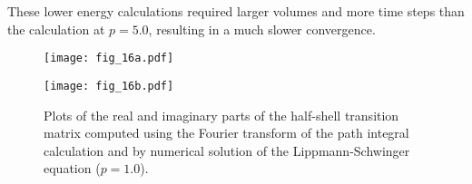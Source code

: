 \documentclass[aps,prc,reprint,noshowpacs,groupedaddress,onecolumn]{revtex4}
\begin{document}
These lower energy calculations required larger volumes and more time steps than
the calculation at $p=5.0$, resulting in a much slower convergence.
\begin{figure}
\caption{Plots of the real and imaginary parts of the
half-shell transition
matrix computed using the Fourier transform of the path integral
calculation and by numerical solution of the Lippmann-Schwinger
equation ($p=1.0$).}
\begin{minipage}[t]{.45\linewidth} 
\centering
\texttt{[image: fig\_16a.pdf]}
\end{minipage}
\begin{minipage}[t]{.45\linewidth}
\centering
\texttt{[image: fig\_16b.pdf]}
\end{minipage}
\label{figure 16}
\end{figure}
\end{document}
